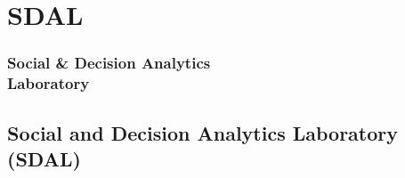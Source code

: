 \documentclass[compress]{beamer}
\begin{document}

\section[SDAL]{SDAL}

    \begin{frame}[Section] \frametitle{\vspace{-0.2in}Social \& Decision Analytics\\Laboratory}
    \end{frame}

\subsection[Social and Decision Analytics Laboratory (SDAL)]{Social and Decision Analytics Laboratory (SDAL)}
\end{document}
